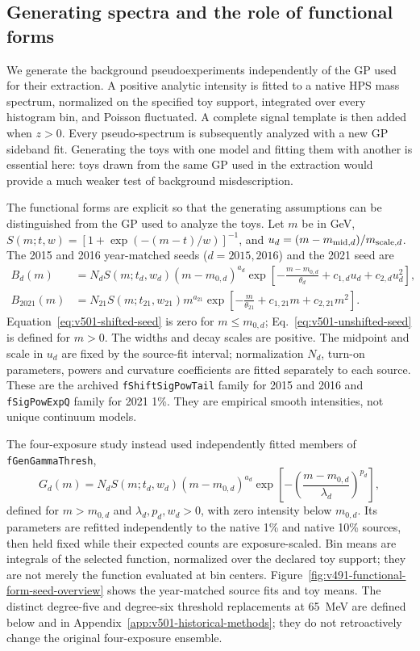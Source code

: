 \subsection{Generating spectra and the role of functional forms}

We generate the background pseudoexperiments independently of the GP used for their
extraction. A positive analytic intensity is fitted to a native HPS mass spectrum,
normalized on the specified toy support, integrated over every histogram bin, and
Poisson fluctuated.  A complete signal template is then added when $z>0$.  Every
pseudo-spectrum is subsequently analyzed with a new GP sideband fit. Generating the
toys with one model and fitting them with another is essential here: toys drawn from
the same GP used in the extraction would provide a much weaker test of background
misdescription.

The functional forms are explicit so that the generating assumptions can
be distinguished from the GP used to analyze the toys. Let $m$ be in GeV,
$S(m;t,w)=[1+\exp(-(m-t)/w)]^{-1}$, and
$u_d=(m-m_{{\rm mid},d})/m_{{\rm scale},d}$.
The 2015 and 2016 year-matched seeds ($d=2015,2016$) and the
2021 seed are
\begin{align}
 B_d(m)&=N_d S(m;t_d,w_d)(m-m_{0,d})^{a_d}
 \exp\!\left[-\frac{m-m_{0,d}}{\theta_d}
               +c_{1,d}u_d+c_{2,d}u_d^2\right],
 \label{eq:v501-shifted-seed}\\
 B_{2021}(m)&=N_{21}S(m;t_{21},w_{21})m^{a_{21}}
 \exp\!\left[-\frac{m}{\theta_{21}}+c_{1,21}m+c_{2,21}m^2\right].
 \label{eq:v501-unshifted-seed}
\end{align}
Equation~\ref{eq:v501-shifted-seed} is zero for $m\leq m_{0,d}$;
Eq.~\ref{eq:v501-unshifted-seed} is defined for $m>0$.
The widths and decay scales are positive. The midpoint and scale in $u_d$
are fixed by the source-fit interval; normalization $N_d$, turn-on
parameters, powers and curvature coefficients are fitted separately to
each source. These are the archived \texttt{fShiftSigPowTail} family
for 2015 and 2016 and \texttt{fSigPowExpQ} family for 2021 1\%.
They are empirical smooth intensities, not unique continuum models.

The four-exposure study instead used independently fitted members of
\texttt{fGenGammaThresh},
\begin{equation}
 G_d(m)=N_d S(m;t_d,w_d)(m-m_{0,d})^{a_d}
 \exp\!\left[-\left(\frac{m-m_{0,d}}{\lambda_d}\right)^{p_d}\right],
 \label{eq:v501-gengamma-seed}
\end{equation}
defined for $m>m_{0,d}$ and $\lambda_d,p_d,w_d>0$, with zero intensity
below $m_{0,d}$. Its parameters are refitted independently
to the native 1\% and native 10\% sources, then held fixed while their
expected counts are exposure-scaled. Bin means are integrals of the
selected function, normalized over the declared toy support; they are
not merely the function evaluated at bin centers.
Figure~\ref{fig:v491-functional-form-seed-overview} shows the year-matched
source fits and toy means. The distinct degree-five and degree-six
threshold replacements at 65~MeV are defined below and in
Appendix~\ref{app:v501-historical-methods}; they do not retroactively change
the original four-exposure ensemble.

